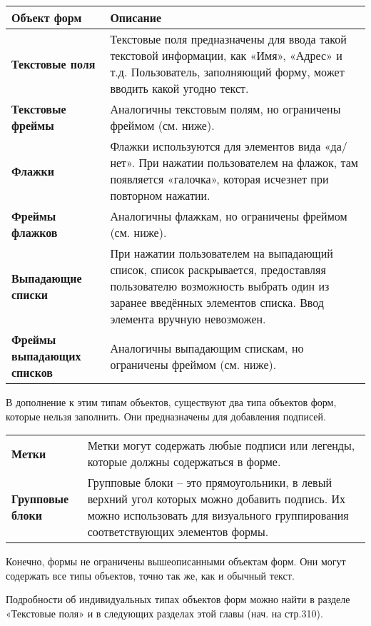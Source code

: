 ﻿\documentclass[a4paper,10pt]{article}
\begin{document}
\begin{center}
\begin{tabular}{  m{5cm}  m{12cm}  }
 \textbf{Объект форм} & \textbf{Описание}\\ 
 \hline
  \textbf{Текстовые поля} & Текстовые поля предназначены для ввода такой текстовой информации, как «Имя», «Адрес» и т.д. Пользователь, заполняющий форму, может вводить какой угодно текст.\\
  \textbf{Текстовые фреймы} & Аналогичны текстовым полям, но ограничены фреймом (см. ниже).\\ 
\textbf{Флажки} & Флажки используются для элементов вида «да/нет». При нажатии пользователем на флажок, там появляется «галочка», которая исчезнет при повторном нажатии.\\
\textbf{Фреймы флажков} & Аналогичны флажкам, но ограничены фреймом (см. ниже).\\
\textbf{Выпадающие списки} & При нажатии пользователем на выпадающий список, список раскрывается, предоставляя пользователю возможность выбрать один из заранее введённых элементов списка. Ввод элемента вручную невозможен.\\
\textbf{Фреймы выпадающих списков} & Аналогичны выпадающим спискам, но ограничены фреймом (см. ниже).\\
\end{tabular}
\end{center}

В дополнение к этим типам объектов, существуют два типа объектов форм, которые нельзя заполнить. Они предназначены для добавления подписей.

\begin{center}
\begin{tabular}{  m{5cm}  m{12cm}  }
 \textbf{Метки} & Метки могут содержать любые подписи или легенды, которые должны содержаться в форме.\\ 
  \textbf{Групповые блоки} & Групповые блоки -- это прямоугольники, в левый верхний угол которых можно добавить подпись. Их можно использовать для визуального группирования соответствующих элементов формы.\\
\end{tabular}
\end{center}

Конечно, формы не ограничены вышеописанными объектам форм. Они могут содержать все типы объектов, точно так же, как и обычный текст.

Подробности об индивидуальных типах объектов форм можно найти в разделе «Текстовые поля» и в следующих разделах этой главы (нач. на стр.310).
\end{document}
